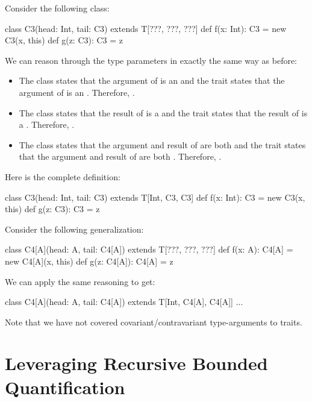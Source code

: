 \documentclass{book}
\begin{document}
Consider the following class:
\begin{scalacode}
class C3(head: Int, tail: C3) extends T[???, ???, ???] {
  def f(x: Int): C3 = new C3(x, this)
  def g(z: C3): C3 = z
}
\end{scalacode}
We can reason through the type parameters in exactly the same way as before:
\begin{itemize}
  \item The class states that the argument of  is an 
  and the trait states that the argument of  is an .
  Therefore, .

  \item The class states that the result of  is a 
  and the trait states that the result of  is a .
  Therefore, .

  \item The class states that the argument and result of  are both 
  and the trait states that the argument and result of  are both .
  Therefore, .
\end{itemize}
Here is the complete definition:
\begin{scalacode}
class C3(head: Int, tail: C3) extends T[Int, C3, C3] {
  def f(x: Int): C3 = new C3(x, this)
  def g(z: C3): C3 = z
}
\end{scalacode}

Consider the following generalization:
\begin{scalacode}
class C4[A](head: A, tail: C4[A]) extends T[???, ???, ???] {
  def f(x: A): C4[A] = new C4[A](x, this)
  def g(z: C4[A]): C4[A] = z
}
\end{scalacode}

We can apply the same reasoning to get:
\begin{scalacode}
class C4[A](head: A, tail: C4[A]) extends T[Int, C4[A], C4[A]] { ... }
\end{scalacode}

\begin{instructor}
Note that we have not covered covariant/contravariant type-arguments to traits.
\end{instructor}

\section{Leveraging Recursive Bounded Quantification}
\end{document}

